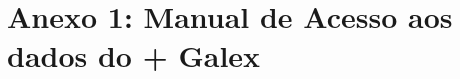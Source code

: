 



\chapter{Anexo 1: Manual de Acesso aos dados do \starlight + Galex}
\label{anexo:ManualStarlightGalex}

